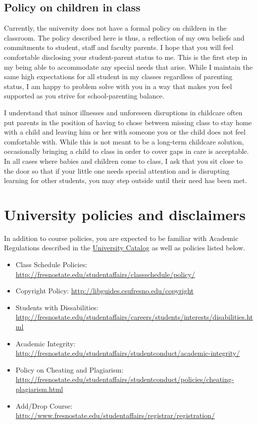 \hypertarget{policy-on-children-in-class}{%
\subsection{Policy on children in
class}\label{policy-on-children-in-class}}

Currently, the university does not have a formal policy on children in
the classroom. The policy described here is thus, a reflection of my own
beliefs and commitments to student, staff and faculty parents. I hope
that you will feel comfortable disclosing your student-parent status to
me. This is the first step in my being able to accommodate any special
needs that arise. While I maintain the same high expectations for all
student in my classes regardless of parenting status, I am happy to
problem solve with you in a way that makes you feel supported as you
strive for school-parenting balance.

I understand that minor illnesses and unforeseen disruptions in
childcare often put parents in the position of having to chose between
missing class to stay home with a child and leaving him or her with
someone you or the child does not feel comfortable with. While this is
not meant to be a long-term childcare solution, occasionally bringing a
child to class in order to cover gaps in care is acceptable. In all
cases where babies and children come to class, I ask that you sit close
to the door so that if your little one needs special attention and is
disrupting learning for other students, you may step outside until their
need has been met.

\hypertarget{university-policies-and-disclaimers}{%
\section{University policies and
disclaimers}\label{university-policies-and-disclaimers}}

In addition to course policies, you are expected to be familiar with
Academic Regulations described in the
\href{http://www.fresnostate.edu/catalog/academic-regulations/}{University
Catalog} as well as policies listed below.

\begin{itemize}
\tightlist
\item
  Class Schedule Policies:
  \url{http://fresnostate.edu/studentaffairs/classschedule/policy/}
\item
  Copyright Policy: \url{http://libguides.csufresno.edu/copyright}
\item
  Students with Dissabilities:
  \url{http://fresnostate.edu/studentaffairs/careers/students/interests/disabilities.html}
\item
  Academic Integrity:
  \url{http://fresnostate.edu/studentaffairs/studentconduct/academic-integrity/}
\item
  Policy on Cheating and Plagiarism:
  \url{http://fresnostate.edu/studentaffairs/studentconduct/policies/cheating-plagiarism.html}
\item
  Add/Drop Course:
  \url{http://www.fresnostate.edu/studentaffairs/registrar/registration/}
\end{itemize}
